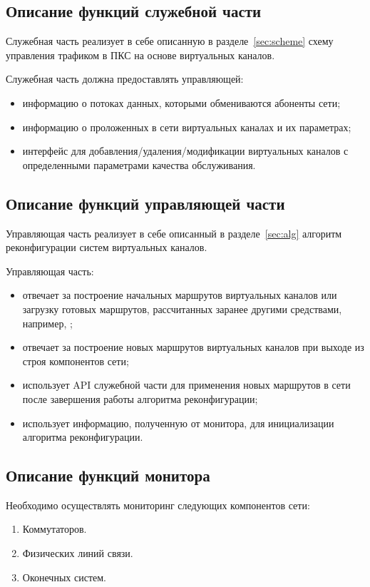 \documentclass[12pt, a4paper]{article}
\begin{document}
\subsection{Описание функций служебной части}
Служебная часть реализует в себе описанную в разделе~\ref{sec:scheme} схему управления трафиком в ПКС на основе виртуальных каналов.
 
Служебная часть должна предоставлять управляющей:
\begin{itemize}
	\item информацию о потоках данных, которыми обмениваются абоненты сети;
	\item информацию о проложенных в сети виртуальных каналах и их параметрах;
	\item интерфейс для добавления/удаления/модификации виртуальных каналов с определенными параметрами качества обслуживания.
\end{itemize}

\subsection{Описание функций управляющей части}
Управляющая часть реализует в себе описанный в разделе~\ref{sec:alg} алгоритм реконфигурации систем виртуальных каналов.

Управляющая часть:
\begin{itemize}
	\item отвечает за построение начальных маршрутов виртуальных каналов или загрузку готовых маршрутов, рассчитанных заранее другими средствами, например, \cite{vdovin};
	\item отвечает за построение новых маршрутов виртуальных каналов при выходе из строя компонентов сети;
	\item использует API служебной части для применения новых маршрутов в сети после завершения работы алгоритма реконфигурации;
	\item использует информацию, полученную от монитора, для инициализации алгоритма реконфигурации.
\end{itemize}

\subsection{Описание функций монитора} \label{subsec:monitor}

Необходимо осуществлять мониторинг следующих компонентов сети:
\begin{enumerate}
	\item Коммутаторов.
	\item Физических линий связи.
	\item Оконечных систем.
\end{enumerate}
\end{document}
